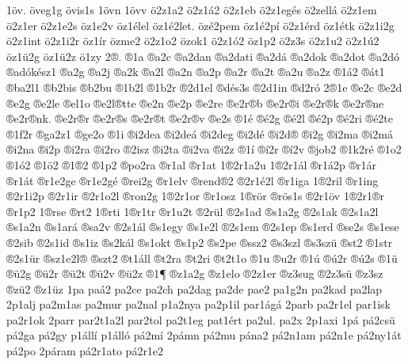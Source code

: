 {1^^f6v.
^^f6veg1g
^^f6vis1s
1^^f6vn
1^^f6vv
^^f62z1a2
^^f62z1^^e12
^^f62z1eb
^^f62z1eg^^e9s
^^f62zell^^e1
^^f62z1em
^^f62z1er
^^f62z1e2s
^^f6z1e2v
^^f6z1^^e9lel
^^f6z1^^e92let.
^^f6z^^e92pem
^^f6z1^^e92p^^ed
^^f62z1^^e9rd
^^f6z1^^e9tk
^^f62z1i2g
^^f62z1int
^^f62z1i2r
^^f6z1^^edr
^^f6zme2
^^f62z1o2
^^f6zok1
^^f62z1^^f32
^^f6z1p2
^^f62z3s
^^f62z1u2
^^f62z1^^fa2
^^f6z1^^fc2g
^^f6z1^^fc2z
^^f61zy
2^^ae.
^^ae1a
^^aea2c
^^aea2dan
^^aea2dati
^^aea2d^^e1
^^aea2dok
^^aea2dot
^^aea2d^^f3
^^aead^^f3k^^e9sz1
^^aea2g
^^aea2j
^^aea2k
^^aea2l
^^aea2n
^^aea2p
^^aea2r
^^aea2t
^^aea2u
^^aea2z
^^ae1^^e12
^^ae^^e1t1
^^aeba2l1
^^aeb2bis
^^aeb2bu
^^ae1b2l
^^ae1b2r
^^ae2d1el
^^aed^^e9s3s
^^ae2d1in
^^aed2r^^f3
2^^ae1e
^^aee2c
^^aee2d
^^aee2g
^^aee2le
^^aeel1o
^^aee2l^^aette
^^aee2n
^^aee2p
^^aee2re
^^aee2r^^aeb
^^aee2r^^aei
^^aee2r^^aek
^^aee2r^^aene
^^aee2r^^aenk.
^^aee2r^^aer
^^aee2r^^aes
^^aee2r^^aet
^^aee2r^^aev
^^aee2s
^^ae1^^e9
^^ae^^e92g
^^ae^^e92l
^^ae^^e92p
^^ae^^e92ri
^^ae^^e92te
^^ae1f2r
^^aega2z1
^^aege2o
^^ae1i
^^aei2dea
^^aei2de^^e1
^^aei2deg
^^aei2d^^e9
^^aei2d^^ae
^^aei2g
^^aei2ma
^^aei2m^^e1
^^aei2na
^^aei2p
^^aei2ra
^^aei2ro
^^ae2isz
^^aei2ta
^^aei2va
^^aei2z
^^ae1^^ed
^^ae^^ed2r
^^ae^^ed2v
^^aejob2
^^ae1k2r^^e9
^^ae1o2
^^ae1^^f32
^^ae1^^f62
^^ae1^^ae2
^^ae1p2
^^aepo2ra
^^aer1al
^^aer1at
1^^ae2r1a2u
1^^ae2r1^^e1l
^^aer1^^e12p
^^aer1^^e1r
^^aer1^^e1t
^^aer1e2ge
^^aer1e2g^^e9
^^aerei2g
^^aer1elv
^^aerend^^ae2
^^ae2r1^^e92l
^^aer1iga
1^^ae2ril
^^aer1ing
^^ae2r1i2p
^^ae2r1ir
^^ae2r1o2l
^^aeron2g
1^^ae2r1or
^^aer1osz
1^^aer^^f6r
^^aer^^f6s1s
^^ae2r1^^f6v
1^^ae2r1^^aer
^^aer1p2
1^^aerse
^^aert2
1^^aerti
1^^aer1tr
^^aer1u2t
^^ae2r^^fcl
^^ae2s1ad
^^aes1a2g
^^ae2s1ak
^^ae2s1a2l
^^aes1a2n
^^aes1ar^^e1
^^aesa2v
^^ae2s1^^e1l
^^aes1egy
^^aes1e2l
^^ae2s1em
^^ae2s1ep
^^aes1erd
^^aese2s
^^aes1ese
^^ae2sib
^^ae2s1id
^^aes1iz
^^aes2k^^e1l
^^aes1okt
^^aes1p2
^^aes2pe
^^aessz2
^^aes3szl
^^aes3sz^^fc
^^aest2
^^ae1str
^^ae2s1^^fcr
^^aesz1e2l^^ae
^^aeszt2
^^aet1^^e1ll
^^aet2ra
^^aet2ri
^^aet2t1o
^^ae1u
^^aeu2r
^^ae1^^fa
^^ae^^fa2r
^^ae^^fa2s
^^ae1^^fc
^^ae^^fc2g
^^ae^^fc2r
^^ae^^fc2t
^^ae^^fc2v
^^ae^^fc2z
^^ae1^^b6
^^aez1a2g
^^aez1elo
^^ae2z1er
^^aez3sug
^^ae2z3s^^fc
^^aez3sz
^^aez^^fc2
^^aez1^^fcz
1pa
pa^^e12
pa2ce
pa2ch
pa2dag
pa2de
pae2
pa1g2n
pa2kad
pa2lap
2p1alj
pa2m1as
pa2mur
pa2nal
p1a2nya
pa2p1il
par1^^e1g^^e1
2parb
pa2r1el
par1isk
pa2r1ok
2parr
par2t1a2l
par2tol
pa2t1eg
pat1^^e9rt
pa2ul.
pa2x
2p1axi
1p^^e1
p^^e12cs^^fc
p^^e12ga
p^^e12gy
p1^^e1ll^^ed
p1^^e1ll^^f3
p^^e12m^^ed
2p^^e1mn
p^^e12mu
p^^e1na2
p^^e12n1am
p^^e12n1e
p^^e12ny1^^e1t
p^^e12po
2p^^e1ram
p^^e12r1ato
p^^e12r1e2
}
